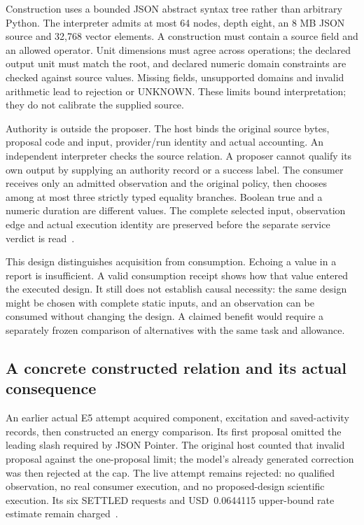 Construction uses a bounded JSON abstract syntax tree rather than arbitrary
Python. The interpreter admits at most 64 nodes, depth eight, an 8 MB JSON
source and 32,768 vector elements. A construction must contain a source
field and an allowed operator. Unit dimensions must agree across operations;
the declared output unit must match the root, and declared numeric domain
constraints are checked against source values. Missing fields, unsupported
domains and invalid arithmetic lead to rejection or UNKNOWN. These limits
bound interpretation; they do not calibrate the supplied source.

Authority is outside the proposer. The host binds the original source bytes,
proposal code and input, provider/run identity and actual accounting. An
independent interpreter checks the source relation. A proposer cannot
qualify its own output by supplying an authority record or a success label.
The consumer receives only an admitted observation and the original policy,
then chooses among at most three strictly typed equality branches. Boolean
true and a numeric duration are different values. The complete selected
input, observation edge and actual execution identity are preserved before
the separate service verdict is read~\cite{contract,posthoc,adapter}.

This design distinguishes acquisition from consumption. Echoing a value in
a report is insufficient. A valid consumption receipt shows how that value
entered the executed design. It still does not establish causal necessity:
the same design might be chosen with complete static inputs, and an
observation can be consumed without changing the design. A claimed benefit
would require a separately frozen comparison of alternatives with the same
task and allowance.

\subsection{A concrete constructed relation and its actual consequence}
An earlier actual E5 attempt acquired component, excitation and saved-activity
records, then constructed an energy comparison. Its first proposal omitted
the leading slash required by JSON Pointer. The original host counted that
invalid proposal against the one-proposal limit; the model's already generated
correction was then rejected at the cap. The live attempt remains rejected:
no qualified observation, no real consumer execution, and no proposed-design
scientific execution. Its six SETTLED requests and USD~0.0644115 upper-bound
rate estimate remain charged~\cite{original}.

